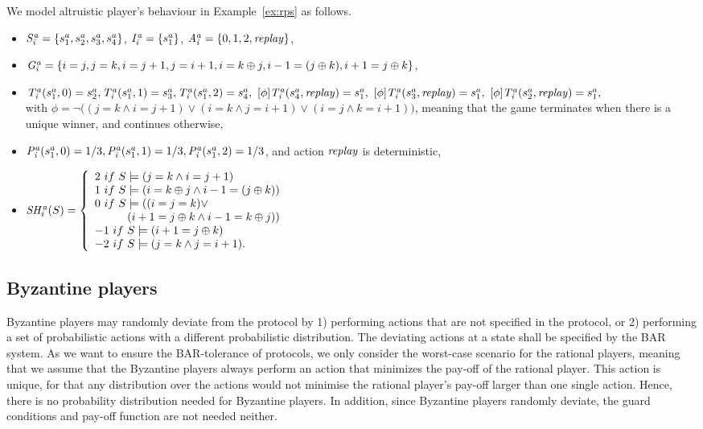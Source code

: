 We model altruistic player's behaviour in Example~\ref{ex:rps} as follows.
\begin{itemize}
\item
$\mathit{S^a_i}=\{s^a_1, s^a_2, s^a_3, s^a_4\}$, $\mathit{I^a_i}=\{s^a_1\}$, $\mathit{A^a_i}=\{0,1,2,\mathit{replay}\}$, 
\item
$\mathit{G^a_i}=\{i = j, j = k, i = j + 1, j = i + 1, i=k\oplus j, i-1 = (j\oplus k), i + 1=j\oplus k \}$,
\item
$\mathit{T^a_i}(s^a_1, 0) = s^a_2,
\mathit{T^a_i}(s^a_1, 1) = s^a_3,
\mathit{T^a_i}(s^a_1, 2) = s^a_4,\\
~[\phi]\mathit{T^a_i}(s^a_4,\mathit{replay})= s^a_1,
~[\phi]\mathit{T^a_i}(s^a_3,\mathit{replay})= s^a_1,\\
~[\phi]\mathit{T^a_i}(s^a_2,\mathit{replay})= s^a_1,$\\
with $\phi=\neg\big((j=k \land i = j + 1) \vee (i=k\land j=i+1) \vee (i=j\land k=i+1)\big)$,
meaning that the game terminates when there is a unique winner, and continues otherwise,
\item 
$\mathit{P^a_i}(s^a_1, 0) = 1/3, \mathit{P^a_i}(s^a_1, 1)= 1/3, \mathit{P^a_i}(s^a_1, 2) = 1/3$, and action $\mathit{replay}$ is deterministic,
\item 
$\shia(\gs)=\left\{\begin{array}{l}
2\ \mbox{if}\ \gs \sat (j=k \land i = j + 1)\\
1\ \mbox{if}\ \gs \sat (i=k\oplus j \land i-1 = (j\oplus k))\\
0\ \mbox{if}\ \gs \sat ((i = j = k)\vee \\
\hfill(i+1=j\oplus k \land i-1=k\oplus j))\\
-1\ \mbox{if}\ \gs \sat (i + 1=j\oplus k)\\
-2\ \mbox{if}\ \gs \sat (j=k \land j = i + 1).\\
\end{array}\right. $
\end{itemize}


\subsection{Byzantine players}
Byzantine players may randomly deviate from the protocol by 1) performing actions that are not specified in the protocol, or 2) performing a set of probabilistic actions with a different probabilistic distribution. The deviating actions at a state shall be specified by the BAR system. As we want to ensure the BAR-tolerance of protocols, we only consider the worst-case scenario for the rational players, meaning that we assume that the Byzantine players always perform an action that minimizes the pay-off of the rational player. This action is unique, for that any distribution over the actions would not minimise the rational player's pay-off larger than one single action. Hence, there is no probability distribution needed for Byzantine players. In addition, since Byzantine players randomly deviate, the guard conditions and pay-off function are not needed neither.

